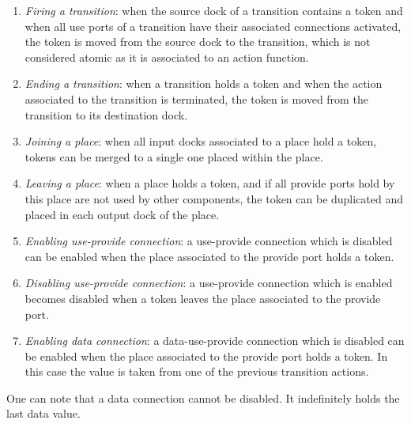 \begin{enumerate}
\item \emph{Firing a transition}: when the source dock of a transition
  contains a token and when all use ports of a transition have their
  associated connections activated, the token is moved from the source
  dock to the transition, which is not considered atomic as it is
  associated to an action function.
\item \emph{Ending a transition}: when a transition holds a token and
  when the action associated to the transition is terminated, the
  token is moved from the transition to its destination dock.
\item \emph{Joining a place}: when all input docks associated to a
  place hold a token, tokens can be merged to a single one placed
  within the place.
\item \emph{Leaving a place}: when a place holds a token, and if all
  provide ports hold by this place are not used by other components,
  the token can be duplicated and placed in each output dock of the
  place.
\item \emph{Enabling use-provide connection}: a use-provide connection
  which is disabled can be enabled when the place associated to the
  provide port holds a token.
\item \emph{Disabling use-provide connection}: a use-provide
  connection which is enabled becomes disabled when a token leaves the
  place associated to the provide port.
\item \emph{Enabling data connection}: a data-use-provide connection
  which is disabled can be enabled when the place associated to the
  provide port holds a token. In this case the value is taken from one
  of the previous transition actions.
\end{enumerate}

One can note that a data connection cannot be disabled. It
indefinitely holds the last data value.


